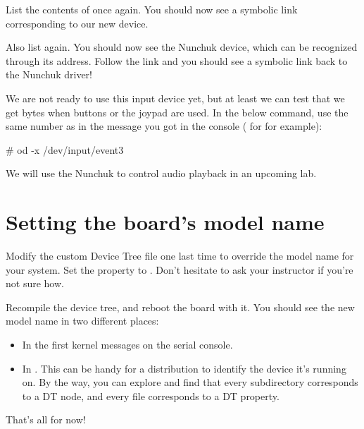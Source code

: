 List the contents of  once again. You
should now see a symbolic link corresponding to our new device.

Also list  again. You should now see the
Nunchuk device, which can be recognized through its  address.
Follow the link and you should see a symbolic link back to the Nunchuk
driver!

We are not ready to use this input device yet, but at least we can test
that we get bytes when buttons or the joypad are used. In the below
command, use the same number as in the message you got in the console
( for  for example):

\begin{bashinput}
# od -x /dev/input/event3
\end{bashinput}

We will use the Nunchuk to control audio playback in an upcoming lab.

\section{Setting the board's model name}

Modify the custom Device Tree file one last time to override the model
name for your system. Set the  property to
. Don't hesitate to ask your
instructor if you're not sure how.

Recompile the device tree, and reboot the board with it. You should see
the new model name in two different places:

\begin{itemize}
\item In the first kernel messages on the serial console.
\item In . This can be
      handy for a distribution to identify the device it's running on.
      By the way, you can explore  and
      find that every subdirectory corresponds to a DT node, and every
      file corresponds to a DT property.
\end{itemize}

That's all for now!
